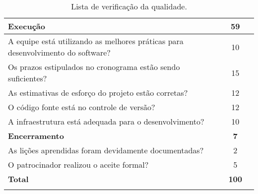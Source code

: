 \begin{longtable}{ p{} c c }
    \midrule
    \toprule
	\textbf{Execução}                                                               & \textbf{59}              &                          \\
    \bottomrule
	A equipe está utilizando as melhores práticas para desenvolvimento do software? & 10                       &                          \\
    \midrule
	Os prazos estipulados no cronograma estão sendo suficientes?                     & 15                       &                          \\
    \midrule
	As estimativas de esforço do projeto estão corretas?                            & 12                       &                          \\
    \midrule
	O código fonte está no controle de versão?                                     & 12                       &                          \\
    \midrule
	A infraestrutura está adequada para o desenvolvimento?                           & 10                       &                          \\
    \midrule
    \toprule
	\textbf{Encerramento}                                                             & \textbf{7}               &                          \\
    \bottomrule
	As lições aprendidas foram devidamente documentadas?                            & 2                        &                          \\
    \midrule
	O patrocinador realizou o aceite formal?                                          & 5                        &                          \\
    \midrule
    \toprule
	\textbf{Total}                                                                    & \textbf{100}             &                          \\
	\bottomrule
	\caption{Lista de verificação da qualidade.}
	\centering
\end{longtable}